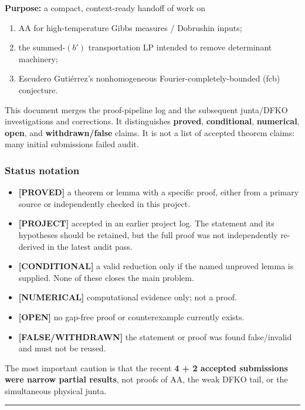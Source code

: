 \textbf{Purpose:} a compact, context-ready handoff of work on

\begin{enumerate}
\def\labelenumi{\arabic{enumi}.}
\tightlist
\item
  AA for high-temperature Gibbs measures / Dobrushin inputs;
\item
  the summed-\((b')\) transportation LP intended to remove determinant machinery;
\item
  Escudero Gutiérrez's nonhomogeneous Fourier-completely-bounded (fcb) conjecture.
\end{enumerate}

This document merges the proof-pipeline log and the subsequent junta/DFKO investigations and corrections. It distinguishes \textbf{proved}, \textbf{conditional}, \textbf{numerical}, \textbf{open}, and \textbf{withdrawn/false} claims. It is not a list of accepted theorem claims: many initial submissions failed audit.

\subsubsection{Status notation}\label{status-notation}

\begin{itemize}
\tightlist
\item
  \textbf{{[}PROVED{]}} a theorem or lemma with a specific proof, either from a primary source or independently checked in this project.
\item
  \textbf{{[}PROJECT{]}} accepted in an earlier project log. The statement and its hypotheses should be retained, but the full proof was not independently re-derived in the latest audit pass.
\item
  \textbf{{[}CONDITIONAL{]}} a valid reduction only if the named unproved lemma is supplied. None of these closes the main problem.
\item
  \textbf{{[}NUMERICAL{]}} computational evidence only; not a proof.
\item
  \textbf{{[}OPEN{]}} no gap-free proof or counterexample currently exists.
\item
  \textbf{{[}FALSE/WITHDRAWN{]}} the statement or proof was found false/invalid and must not be reused.
\end{itemize}

The most important caution is that the recent \textbf{4 + 2 accepted submissions were narrow partial results}, not proofs of AA, the weak DFKO tail, or the simultaneous physical junta.

\begin{center}\rule{0.5\linewidth}{0.5pt}\end{center}
